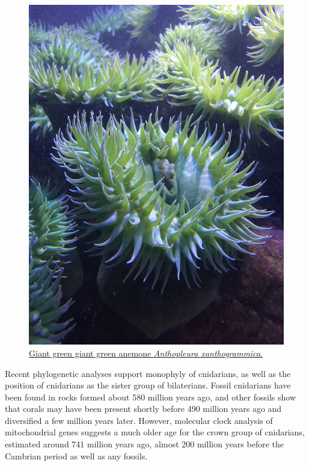 \begin{figure}

{\centering \includegraphics[width=0.7\linewidth]{./figures/porifera/anthopleura_xanthogrammica}

}

\caption{\href{https://en.wikipedia.org/wiki/Anthopleura_xanthogrammica}{Giant
green giant green anemone \emph{Anthopleura xanthogrammica}.}}\label{fig:anthopleura}
\end{figure}

Recent phylogenetic analyses support monophyly of cnidarians, as well as
the position of cnidarians as the sister group of bilaterians. Fossil
cnidarians have been found in rocks formed about 580 million years ago,
and other fossils show that corals may have been present shortly before
490 million years ago and diversified a few million years later.
However, molecular clock analysis of mitochondrial genes suggests a much
older age for the crown group of cnidarians, estimated around 741
million years ago, almost 200 million years before the Cambrian period
as well as any fossils.

